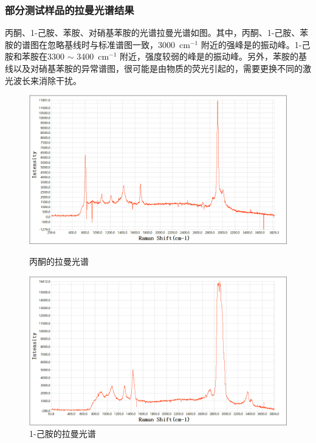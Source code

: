\documentclass[UTF8]{article}
\newcommand{\dw}[1]{\,\mathrm{#1}}
\begin{document}
	\subsubsection{部分测试样品的拉曼光谱结果}
	丙酮、1-己胺、苯胺、对硝基苯胺的光谱拉曼光谱如图。其中，丙酮、1-己胺、苯胺的谱图在忽略基线时与标准谱图一致，3000 $\dw{cm^{-1}}$ 附近的强峰是的振动峰。1-己胺和苯胺在3300 $\sim$ 3400 $\dw{cm^{-1}}$ 附近，强度较弱的峰是的振动峰。另外，苯胺的基线以及对硝基苯胺的异常谱图，很可能是由物质的荧光引起的，需要更换不同的激光波长来消除干扰。

	\begin{figure}[htp]
		\begin{minipage}[t]{0.5\textwidth}
			\centering
			\includegraphics[width=\linewidth]{figures/丙酮.png} 
			\caption{丙酮的拉曼光谱} \label{}
		\end{minipage}
		\begin{minipage}[t]{0.5\textwidth}
			\centering
			\includegraphics[width=\textwidth]{figures/己胺.png}
			\caption{1-己胺的拉曼光谱} \label{}
		\end{minipage}
	\end{figure}
\end{document}
